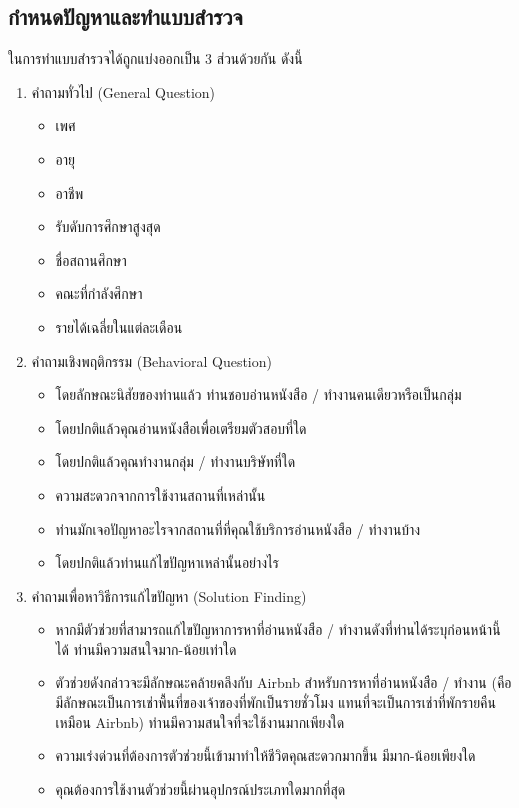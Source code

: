 \subsection{กำหนดปัญหาและทำแบบสำรวจ}
ในการทำแบบสำรวจได้ถูกแบ่งออกเป็น 3 ส่วนด้วยกัน ดังนี้
\begin{enumerate}
    \item คำถามทั่วไป (General Question)
    \begin{itemize}
        \item เพศ
        \item อายุ
        \item อาชีพ
        \item รับดับการศึกษาสูงสุด
        \item ชื่อสถานศึกษา
        \item คณะที่กำลังศึกษา
        \item รายได้เฉลี่ยในแต่ละเดือน
    \end{itemize}
    \item คำถามเชิงพฤติกรรม (Behavioral Question)
    \begin{itemize}
        \item โดยลักษณะนิสัยของท่านแล้ว ท่านชอบอ่านหนังสือ / ทำงานคนเดียวหรือเป็นกลุ่ม
        \item โดยปกติแล้วคุณอ่านหนังสือเพื่อเตรียมตัวสอบที่ใด
        \item โดยปกติแล้วคุณทำงานกลุ่ม / ทำงานบริษัทที่ใด
        \item ความสะดวกจากการใช้งานสถานที่เหล่านั้น
        \item ท่านมักเจอปัญหาอะไรจากสถานที่ที่คุณใช้บริการอ่านหนังสือ / ทำงานบ้าง
        \item โดยปกติแล้วท่านแก้ไขปัญหาเหล่านั้นอย่างไร
    \end{itemize}
    \item คำถามเพื่อหาวิธีการแก้ไขปัญหา (Solution Finding)
    \begin{itemize}
        \item หากมีตัวช่วยที่สามารถแก้ไขปัญหาการหาที่อ่านหนังสือ / ทำงานดังที่ท่านได้ระบุก่อนหน้านี้ได้ ท่านมีความสนใจมาก-น้อยเท่าใด
        \item ตัวช่วยดังกล่าวจะมีลักษณะคล้ายคลึงกับ Airbnb สำหรับการหาที่อ่านหนังสือ / ทำงาน (คือมีลักษณะเป็นการเช่าพื้นที่ของเจ้าของที่พักเป็นรายชั่วโมง แทนที่จะเป็นการเช่าที่พักรายคืนเหมือน Airbnb) ท่านมีความสนใจที่จะใช้งานมากเพียงใด
        \item ความเร่งด่วนที่ต้องการตัวช่วยนี้เข้ามาทำให้ชีวิตคุณสะดวกมากขึ้น มีมาก-น้อยเพียงใด
        \item คุณต้องการใช้งานตัวช่วยนี้ผ่านอุปกรณ์ประเภทใดมากที่สุด

\end{itemize}
\end{enumerate}

